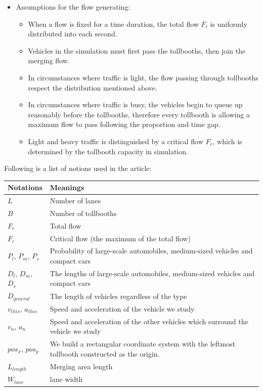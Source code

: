 \documentclass{mcmthesis}
\begin{document}
\begin{itemize}
    \item Assumptions for the flow generating:
    \begin{itemize}
    \item When a flow is fixed for a time duration, the total flow $F_t$ is uniformly distributed into each second.
	\item Vehicles in the simulation must first pass the tollbooths, then join the merging flow.
   	\item In circumstances where traffic is light, the flow passing through tollbooths respect the distribution mentioned above.
    \item In circumstances where traffic is busy, the vehicles begin to queue up reasonably before the tollbooths, therefore every tollbooth is allowing a maximum flow to pass following the proportion and time gap.
    \item Light and heavy traffic is distinguished by a critical flow $F_c$, which is determined by the tollbooth capacity in simulation.
    \end{itemize}
	
	
\end{itemize}

Following is a list of notions used in the article:
\begin{table}[h]
\centering
   \begin{tabular}{|m{7cm}<{\centering}|p{7cm}<{\centering}|}
   	
   	\hline
   	Notations & Meanings \\
   	\hline
   	$L$ &  Number of lanes \\
   	\hline
   	$B$ &  Number of tollbooths\\
   	\hline
   	$F_t$ & 	 Total flow\\
   	\hline
   	$F_c$ & Critical flow (the maximum of the total flow)\\
   	\hline
   	$P_l$,  $P_m$, $P_s$ & Probability of large-scale automobiles, medium-sized vehicles and compact cars\\
   	\hline
   	$D_l$, $D_m$, $D_s$ & The lengths of large-scale automobiles, medium-sized vehicles and compact cars\\
   	\hline
   	$D_{general}$ & The length of vehicles regardless of the type\\
   	\hline
   	$v_{this}$, $a_{this}$ & Speed and acceleration of the vehicle we study\\
   	\hline
   	$v_n$, $a_n$ &  Speed and acceleration of the other vehicles which surround the vehicle we study\\
   	\hline
   	$pos_x$, $pos_y$ & We build a rectangular coordinate system  with the leftmost tollbooth constructed as the origin.\\
   	\hline
   	$L_{length}$ & Merging area length \\
   	\hline
   	$W_{lane}$ & lane width \\
   	\hline

   \end{tabular}
\end{table}\\
\end{document}
